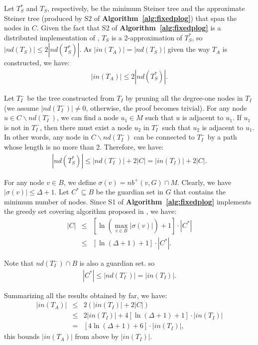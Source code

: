\documentclass[10pt, conference, compsocconf]{IEEEtran}
\begin{document}
\begin{IEEEproof}
Let $T^*_S$ and $T_S$, respectively, be the minimum Steiner tree and the approximate Steiner tree (produced by S2 of \textbf{Algorithm~\ref{alg:fixedplog}}) that span the nodes in $C$. Given the fact that S2 of \textbf{Algorithm~\ref{alg:fixedplog}} is a distributed implementation of \cite{Kou1981}, $T_S$ is a 2-approximation of $T^*_S$, so $|\mathit{nd}(T_S)| \le 2|\mathit{nd}({T^*_S})|$. As $|\mathit{in}({T_A})| = |\mathit{nd}(T_S)|$ given the way $T_A$ is constructed, we have:
\begin{eqnarray}
        |\mathit{in}({T_A})| \le 2|\mathit{nd}({T^*_S})|.
      \end{eqnarray}

      Let $T^-_I$ be the tree constructed from $T_I$ by pruning all the degree-one nodes in $T_I$ (we assume $|\mathit{nd}(T^-_I)| \neq 0$, otherwise, the proof becomes trivial). For any node $u \in C \backslash \mathit{nd}({T^-_I})$, we can find a node $u_1 \in M$ such that $u$ is adjacent to $u_1$. If $u_1$ is not in $T^-_I$, then there must exist a node $u_2$ in $T^-_I$ such that $u_2$ is adjacent to $u_1$. In other words, any node in $C \backslash \mathit{nd}({T^-_I})$ can be connected to $T^-_I$ by a path whose length is no more than 2. Therefore, we have:
\begin{eqnarray}
        |\mathit{nd}({T^*_S})| \le |\mathit{nd}({T^-_I})| + 2|C| = |\mathit{in}({T_I})| + 2|C|.
      \end{eqnarray}

      For any node $v\in B$, we define $\sigma(v)=\mathit{nb}^+(v,G)\cap M$. Clearly, we have $|\sigma(v)|\leq \Delta+1$. Let $C^* \subseteq B$ be the guardian set in $G$ that contains the minimum number of nodes. Since S1 of \textbf{Algorithm~\ref{alg:fixedplog}} implements the greedy set covering algorithm proposed in \cite{Cormen2001}, we have:
\begin{eqnarray}
        |C| &\le& \left[\ln \left(\max_{v \in B}|\sigma (v)|\right) + 1\right] \cdot |C^*| \nonumber \\
        &\le& \left[\ln (\Delta  + 1) + 1\right] \cdot |{C^*}|.
      \end{eqnarray}

      Note that $\mathit{nd}({T^-_I})\cap B$ is also a guardian set. so
\begin{eqnarray}
        |{C^*}| \le |\mathit{nd}({T^-_I})| = |\mathit{in}({T_I})|.
      \end{eqnarray}

      Summarizing all the results obtained by far, we have:
\begin{eqnarray}
        |\mathit{in}(T_A)| &\le& 2(|\mathit{in}({T_I})| + 2|C|) \nonumber \\
        &\le& 2|\mathit{in}({T_I})| + 4\left[\ln(\Delta +1) + 1\right] \cdot |\mathit{in}({T_I})| \nonumber \\
        &=& \left[4\ln (\Delta +1) + 6\right] \cdot |\mathit{in}({T_I})|, \nonumber
      \end{eqnarray}
this bounds $|\mathit{in}({T_A})|$ from above by $|\mathit{in}({T_I})|$.
    \end{IEEEproof}
\end{document}
